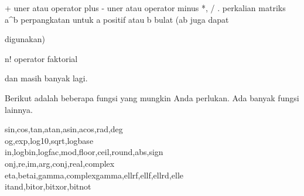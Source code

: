 \documentclass{article}
\newenvironment{eulernotebook}{\par}{\par}
\newenvironment{eulercomment}{\par\medskip}{\par\medskip}
\begin{document}
\begin{eulernotebook}
\begin{eulercomment}
\end{eulercomment}
\begin{eulerttcomment}
 + uner atau operator plus
 - uner atau operator minus
 *, /
 . perkalian matriks
 a^b perpangkatan untuk a positif atau b bulat (ab juga dapat
\end{eulerttcomment}
\begin{eulercomment}
digunakan)\\
\end{eulercomment}
\begin{eulerttcomment}
 n! operator faktorial
\end{eulerttcomment}
\begin{eulercomment}

dan masih banyak lagi.

Berikut adalah beberapa fungsi yang mungkin Anda perlukan. Ada banyak
fungsi lainnya.

sin,cos,tan,atan,asin,acos,rad,deg\\
og,exp,log10,sqrt,logbase\\
in,logbin,logfac,mod,floor,ceil,round,abs,sign\\
onj,re,im,arg,conj,real,complex\\
eta,betai,gamma,complexgamma,ellrf,ellf,ellrd,elle\\
itand,bitor,bitxor,bitnot


\end{eulercomment}
\end{eulernotebook}
\end{document}
